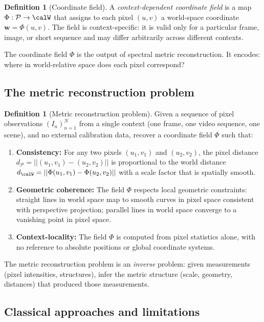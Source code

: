 \documentclass[11pt,twocolumn,a4paper]{article}
\theoremstyle{definition}
\newtheorem{definition}[theorem]{Definition}
\newcommand{\calP}{\mathcal{P}}
\begin{document}
\begin{definition}[Coordinate field]
\label{def:coordfield}
A \emph{context-dependent coordinate field} is a map $\Phi : \calP \to \calW$ that assigns to each pixel $(u,v)$ a world-space coordinate $\bm{w} = \Phi(u, v)$. The field is context-specific: it is valid only for a particular frame, image, or short sequence and may differ arbitrarily across different contexts.
\end{definition}

The coordinate field $\Phi$ is the output of spectral metric reconstruction. It encodes: where in world-relative space does each pixel correspond?

\subsection{The metric reconstruction problem}

\begin{definition}[Metric reconstruction problem]
\label{def:metric_problem}
Given a sequence of pixel observations $(I_n)_{n=1}^{N}$ from a single context (one frame, one video sequence, one scene), and no external calibration data, recover a coordinate field $\Phi$ such that:
\begin{enumerate}[leftmargin=1.4em]
  \item \textbf{Consistency:} For any two pixels $(u_1, v_1)$ and $(u_2, v_2)$, the pixel distance $d_\calP = ||(u_1, v_1) - (u_2, v_2)||$ is proportional to the world distance $d_\calW = ||\Phi(u_1, v_1) - \Phi(u_2, v_2)||$ with a scale factor that is spatially smooth.
  \item \textbf{Geometric coherence:} The field $\Phi$ respects local geometric constraints: straight lines in world space map to smooth curves in pixel space consistent with perspective projection; parallel lines in world space converge to a vanishing point in pixel space.
  \item \textbf{Context-locality:} The field $\Phi$ is computed from pixel statistics alone, with no reference to absolute positions or global coordinate systems.
\end{enumerate}
\end{definition}

The metric reconstruction problem is an \emph{inverse} problem: given measurements (pixel intensities, structures), infer the metric structure (scale, geometry, distances) that produced those measurements.

\subsection{Classical approaches and limitations}
\end{document}
